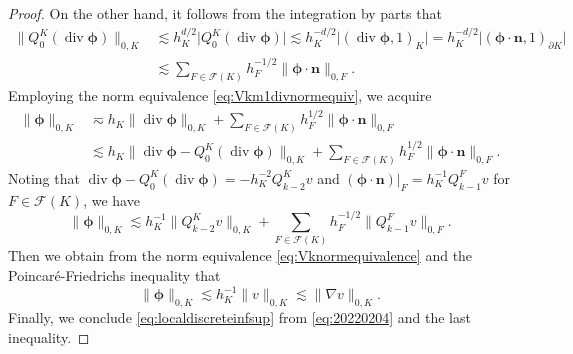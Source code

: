 \documentclass[10pt]{amsart}
\renewcommand{\div}{\operatorname{div}}
\numberwithin{equation}{section}
\begin{document}
\begin{proof}
On the other hand, it follows from the integration by parts that
\begin{align*}
\|Q_0^K(\div\boldsymbol{\phi})\|_{0,K}&\lesssim h_{K}^{d/2}\big|Q_0^K(\div\boldsymbol{\phi})\big|\lesssim h_{K}^{-d/2}\big|(\div\boldsymbol{\phi},1)_{K}\big|=h_{K}^{-d/2}\big|(\boldsymbol{\phi}\cdot\boldsymbol{n},1)_{\partial K}\big| \\
&\lesssim \sum_{F\in\mathcal F(K)}h_F^{-1/2}\|\boldsymbol{\phi}\cdot\boldsymbol{n}\|_{0,F}.
\end{align*}
Employing the norm equivalence \eqref{eq:Vkm1divnormequiv},
we acquire
\begin{align*}
\|\boldsymbol{\phi}\|_{0,K}&\eqsim h_K\|\div\boldsymbol{\phi}\|_{0,K} +\sum_{F\in\mathcal F(K)}h_F^{1/2}\|\boldsymbol{\phi}\cdot\boldsymbol{n}\|_{0,F} \\
&\lesssim h_K\|\div\boldsymbol{\phi}-Q_0^K(\div\boldsymbol{\phi})\|_{0,K} +\sum_{F\in\mathcal F(K)}h_F^{1/2}\|\boldsymbol{\phi}\cdot\boldsymbol{n}\|_{0,F}.
\end{align*}
Noting that $\div\boldsymbol{\phi}-Q_{0}^K(\div\boldsymbol{\phi})=-h_K^{-2}Q_{k-2}^Kv$ and $(\boldsymbol{\phi}\cdot\boldsymbol{n})|_{F}=h_K^{-1}Q_{k-1}^Fv$ for $F\in\mathcal F(K)$, we have
\[
\|\boldsymbol{\phi}\|_{0,K}\lesssim h_K^{-1}\|Q_{k-2}^Kv\|_{0,K} +\sum_{F\in\mathcal F(K)}h_F^{-1/2}\|Q_{k-1}^Fv\|_{0,F}.
\]
Then we obtain from the norm equivalence \eqref{eq:Vknormequivalence} and the Poincar\'e-Friedrichs  inequality \cite[(2.14)]{BrennerSung2018} that
\[
\|\boldsymbol{\phi}\|_{0,K}\lesssim h_K^{-1}\|v\|_{0,K}\lesssim \|\nabla v\|_{0,K}.    
\]
Finally, we conclude \eqref{eq:localdiscreteinfsup} from \eqref{eq:20220204} and the last inequality.
\end{proof}
\end{document}
